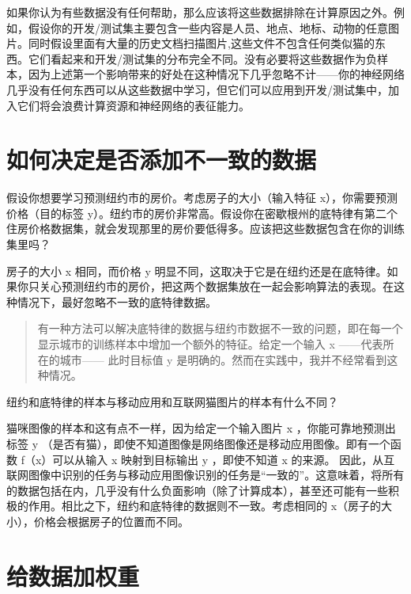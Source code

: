 如果你认为有些数据没有任何帮助，那么应该将这些数据排除在计算原因之外。例如，假设你的开发/测试集主要包含一些内容是人员、地点、地标、动物的任意图片。同时假设里面有大量的历史文档扫描图片,这些文件不包含任何类似猫的东西。它们看起来和开发/测试集的分布完全不同。没有必要将这些数据作为负样本，因为上述第一个影响带来的好处在这种情况下几乎忽略不计------你的神经网络几乎没有任何东西可以从这些数据中学习，但它们可以应用到开发/测试集中，加入它们将会浪费计算资源和神经网络的表征能力。

\hypertarget{ux5982ux4f55ux51b3ux5b9aux662fux5426ux6dfbux52a0ux4e0dux4e00ux81f4ux7684ux6570ux636e}{%
\chapter{如何决定是否添加不一致的数据}\label{ux5982ux4f55ux51b3ux5b9aux662fux5426ux6dfbux52a0ux4e0dux4e00ux81f4ux7684ux6570ux636e}}

假设你想要学习预测纽约市的房价。考虑房子的大小（输入特征
x），你需要预测价格（目的标签
y）。纽约市的房价非常高。假设你在密歇根州的底特律有第二个住房价格数据集，就会发现那里的房价要低得多。应该把这些数据包含在你的训练集里吗？

房子的大小 x 相同，而价格 y
明显不同，这取决于它是在纽约还是在底特律。如果你只关心预测纽约市的房价，把这两个数据集放在一起会影响算法的表现。在这种情况下，最好忽略不一致的底特律数据。

\begin{quote}
有一种方法可以解决底特律的数据与纽约市数据不一致的问题，即在每一个显示城市的训练样本中增加一个额外的特征。给定一个输入
x ------代表所在的城市------ 此时目标值 y
是明确的。然而在实践中，我并不经常看到这种情况。
\end{quote}

纽约和底特律的样本与移动应用和互联网猫图片的样本有什么不同？

猫咪图像的样本和这有点不一样，因为给定一个输入图片 x
，你能可靠地预测出标签 y
（是否有猫），即使不知道图像是网络图像还是移动应用图像。即有一个函数
f（x）可以从输入 x 映射到目标输出 y ，即使不知道 x 的来源。
因此，从互联网图像中识别的任务与移动应用图像识别的任务是``一致的''。这意味着，将所有的数据包括在内，几乎没有什么负面影响（除了计算成本），甚至还可能有一些积极的作用。相比之下，纽约和底特律的数据则不一致。考虑相同的
x（房子的大小），价格会根据房子的位置而不同。

\hypertarget{ux7ed9ux6570ux636eux52a0ux6743ux91cd}{%
\chapter{给数据加权重}\label{ux7ed9ux6570ux636eux52a0ux6743ux91cd}}

